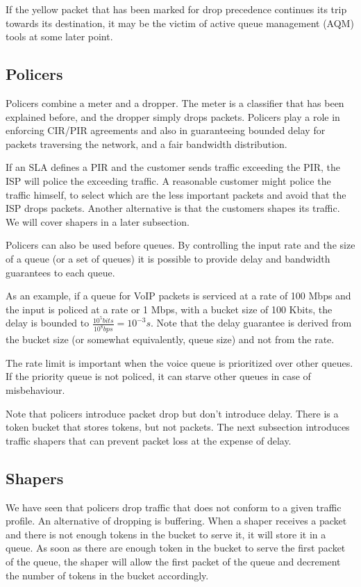 If the yellow packet that has been marked for drop precedence continues its trip towards its destination, it may be the victim of active queue management (AQM) tools at some later point.

\subsection{Policers}

Policers combine a meter and a dropper.
The meter is a classifier that has been explained before, and the dropper simply drops packets.
Policers play a role in enforcing CIR/PIR agreements and also in guaranteeing bounded delay for packets traversing the network, and a fair bandwidth distribution.

If an SLA defines a PIR and the customer sends traffic exceeding the PIR, the ISP will police the exceeding traffic.
A reasonable customer might police the traffic himself, to select which are the less important packets and avoid that the ISP drops packets.
Another alternative is that the customers shapes its traffic.
We will cover shapers in a later subsection.

Policers can also be used before queues.
By controlling the input rate and the size of a queue (or a set of queues) it is possible to provide delay and bandwidth guarantees to each queue.


As an example, if a queue for VoIP packets is serviced at a rate of 100 Mbps and the input is policed at a rate or 1 Mbps, with a bucket size of 100 Kbits, the  delay is bounded to $\frac{10^5 bits}{10^8 bps} = 10^{-3}s$.
Note that the delay guarantee is derived from the bucket size (or somewhat equivalently, queue size) and not from the rate.

The rate limit is important when the voice queue is prioritized over other queues.
If the priority queue is not policed, it can starve other queues in case of misbehaviour.

Note that policers introduce packet drop but don't introduce delay.
There is a token bucket that stores tokens, but not packets.
The next subsection introduces traffic shapers that can prevent packet loss at the expense of delay.

\subsection{Shapers}

We have seen that policers drop traffic that does not conform to a given traffic profile.
An alternative of dropping is buffering.
When a shaper receives a packet and there is not enough tokens in the bucket to serve it, it will store it in a queue.
As soon as there are enough token in the bucket to serve the first packet of the queue, the shaper will allow the first packet of the queue and decrement the number of tokens in the bucket accordingly.

